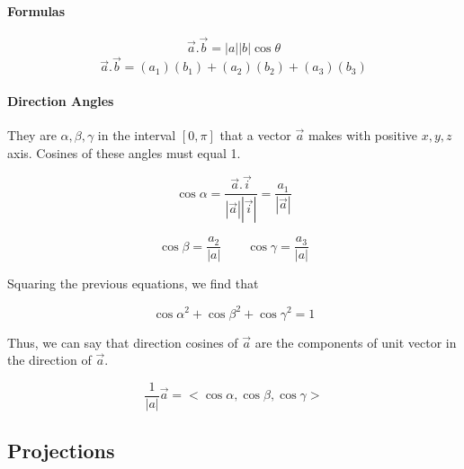 \documentclass{article}
\begin{document}
	\paragraph{Formulas}

	\begin{equation}
		\vec{a} . \vec{b} = |a||b| \cos{\theta} 
	\end{equation}
	\begin{equation}
		\vec{a} . \vec{b} = (a_1)(b_1) + (a_2)(b_2) + (a_3)(b_3)
	\end{equation}

	\paragraph{Direction Angles}
	They are $\alpha, \beta, \gamma$ in the interval $[0,\pi]$ that a vector $\vec{a}$ makes with positive $x,y,z$ axis. Cosines of these angles must equal 1.

	\begin{equation}
		\cos{\alpha} = \frac{\vec{a} . \vec{i}}{|\vec{a}| |\vec{i}|} = \frac{a_1}{|\vec{a}|}
	\end{equation}

	\begin{equation*}
		\cos{\beta} = \frac{a_2}{|a|} \qquad \cos{\gamma} = \frac{a_3}{|a|}	
	\end{equation*}

	Squaring the previous equations, we find that

	\begin{equation}
		\cos{\alpha}^2 + \cos{\beta}^2 + \cos{\gamma}^2 = 1
	\end{equation}

	Thus, we can say that direction cosines of $\vec{a}$ are the components of unit vector in the direction of $ \vec{a}$.

	\begin{equation}
		\frac{1}{|a|} \vec{a} = <\cos{\alpha} , \cos{\beta} , \cos{\gamma}>
	\end{equation}

	\noindent\hrulefill 

	\newpage

	\subsection{Projections}
\end{document}
